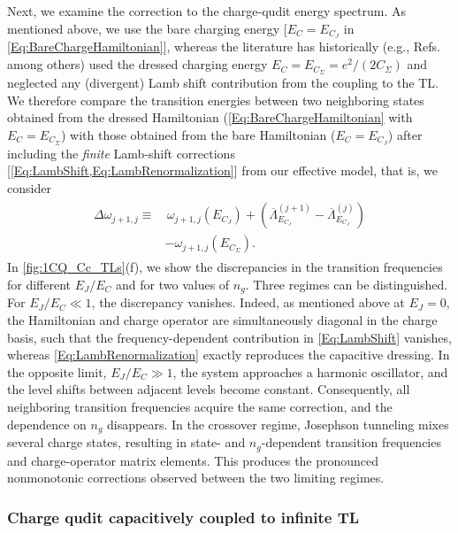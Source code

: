 \documentclass[prx,aps,twocolumn,article]{revtex4-2}
\begin{document}
Next, we examine the correction to the charge-qudit energy spectrum. As mentioned above, we use the bare charging energy [$E_C=E_{C_J}$ in \cref{Eq:BareChargeHamiltonian}], whereas the literature has historically (e.g., Refs.~\cite{CaldeiraLeggett_QT:1983,Esteve:1986,Kockum:2014,Hassler:2019,Gheeraert:2020} among others) used the dressed charging energy $E_C=E_{C_\Sigma}=e^2/(2C_\Sigma)$ and neglected any (divergent) Lamb shift contribution from the coupling to the \gls{TL}. We therefore compare the transition energies between two neighboring states obtained from the dressed Hamiltonian (\cref{Eq:BareChargeHamiltonian} with $E_C=E_{C_\Sigma}$) with those obtained from the bare Hamiltonian ($E_C=E_{C_J}$) after including the \textit{finite} Lamb-shift corrections [\cref{Eq:LambShift,Eq:LambRenormalization}] from our effective model, that is, we consider 
\begin{align}
\begin{aligned}
    \Delta \omega_{j+1,j}\equiv&\, \omega_{j+1,j}(E_{C_J})+(\overline{\Lambda}^{(j+1)}_{E_{C_J}}-\overline{\Lambda}^{(j)}_{E_{C_J}})\\
&-\omega_{j+1,j}(E_{C_\Sigma}). 
\end{aligned}
\label{Eq:FrequencyCorrection}
\end{align} 
In \cref{fig:1CQ_Cc_TLs}(f), we show the discrepancies in the transition frequencies for different $E_J/E_C$ and for two values of $n_g$. Three regimes can be distinguished. For $E_J/E_C\ll1$, the discrepancy vanishes. Indeed, as mentioned above at $E_J=0$, the Hamiltonian and charge operator are simultaneously diagonal in the charge basis, such that the frequency-dependent contribution in \cref{Eq:LambShift} vanishes, whereas \cref{Eq:LambRenormalization} exactly reproduces the capacitive dressing. In the opposite limit, $E_J/E_C\gg1$, the system approaches a harmonic oscillator, and the level shifts between adjacent levels become constant. Consequently, all neighboring transition frequencies acquire the same correction, and the dependence on $n_g$ disappears. In the crossover regime, Josephson tunneling mixes several charge states, resulting in state- and $n_g$-dependent transition frequencies and charge-operator matrix elements. This produces the pronounced nonmonotonic corrections observed between the two limiting regimes.

\subsubsection{Charge qudit capacitively coupled to infinite \gls{TL}}
\label{Sec:SingleQubitInfiniteTL}
\end{document}
